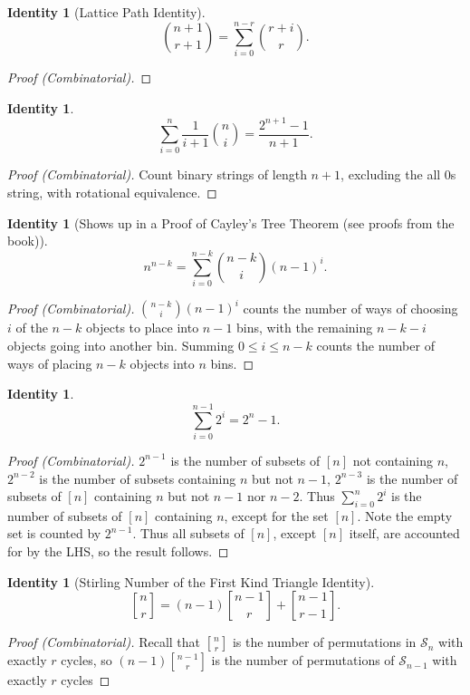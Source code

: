 \documentclass[12]{article}
\newcounter{identityCounter}
\newtheorem{iden}[identityCounter]{Identity}
\theoremstyle{definition}
\begin{document}
	\begin{iden}[Lattice Path Identity]
		$${n+1 \choose r+1} = \sum_{i = 0}^{n-r} {r+i \choose r}.$$
	\end{iden}
	\begin{proof}[Proof (Combinatorial)]
		
	\end{proof}
	
	\begin{iden}
		$$\sum_{i=0}^{n} \frac{1}{i+1} {n \choose i} = \frac{2^{n+1}-1}{n+1}.$$
	\end{iden}
	\begin{proof}[Proof (Combinatorial)]
		Count binary strings of length $n+1$, excluding the all $0$s string, with rotational equivalence.
	\end{proof}

	\begin{iden}[Shows up in a Proof of Cayley's Tree Theorem (see proofs from the book)]
		$$n^{n-k} = \sum_{i=0}^{n-k}{n-k \choose i}(n-1)^i.$$
	\end{iden}
	\begin{proof}[Proof (Combinatorial)]
		${n-k \choose i}(n-1)^i$ counts the number of ways of choosing $i$ of the $n-k$ objects to place into $n-1$ bins, with the remaining $n-k-i$ objects going into another bin.  Summing $0 \leq i \leq n-k$ counts the number of ways of placing $n-k$ objects into $n$ bins.
	\end{proof}

	\begin{iden}
		$$\sum_{i=0}^{n-1} 2^i = 2^n-1.$$
	\end{iden}
	\begin{proof}[Proof (Combinatorial)]
		$2^{n-1}$ is the number of subsets of $[n]$ not containing $n$, $2^{n-2}$ is the number of subsets containing $n$ but not $n-1$, $2^{n-3}$ is the number of subsets of $[n]$ containing $n$ but not $n-1$ nor $n-2$. Thus $\sum_{i = 0}^n 2^i$ is the number of subsets of $[n]$ containing $n$, except for the set $[n]$.  Note the empty set is counted by $2^{n-1}$.  Thus all subsets of $[n]$, except $[n]$ itself, are accounted for by the LHS, so the result follows.
	\end{proof}

	\begin{iden}[Stirling Number of the First Kind Triangle Identity]
		$${n \brack r} = (n-1){n-1 \brack r} + {n-1 \brack r-1}.$$
	\end{iden}
	\begin{proof}[Proof (Combinatorial)]
		Recall that ${n \brack r}$ is the number of permutations in $\mathcal{S}_n$ with exactly $r$ cycles, so $(n-1){n-1 \brack r}$ is the number of permutations of $\mathcal{S}_{n-1}$ with exactly $r$ cycles
	\end{proof}
\end{document}
